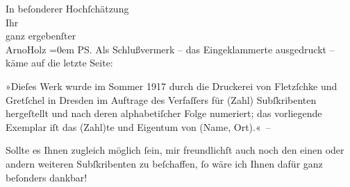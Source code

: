 \pstart
           In beſonderer Hochſchätzung{\\[\baselineskip]}Ihr{\\[\baselineskip]}ganz ergebenſter{\\[\baselineskip]}\spacefill\mbox{ArnoHolz}\pend
           \leftskip=0em{}
\pstart
           PS. Als Schlußvermerk – das Eingeklammerte ausgedruckt – käme auf die letzte
               Seite:\pend
           
\pstart
           »Dieſes Werk wurde im Sommer 1917 durch die Druckerei von Fletzſchke und Gretſchel in Dresden im Auftrage des Verfaſſers für (Zahl) Subſkribenten
               hergeſtellt und nach deren alphabetiſcher Folge numeriert; das vorliegende Exemplar
               iſt das (Zahl)te und Eigentum von (Name, Ort).« –\pend
           
\pstart
           Sollte es Ihnen zugleich möglich{ }ſein, mir freundlichſt auch noch den einen oder
               andern weiteren Subſkribenten zu beſchaffen,{ }ſo wäre ich Ihnen dafür ganz beſonders
               dankbar!\pend
           \endnumbering{}  \newcommand{\dateiname}{L02255}\newcommand{\titel}{Arno Holz an Arthur Schnitzler, 11. 2. 1917}\newcommand{\editorInnen}{Martin Anton Müller und Gerd-Hermann Susen}
